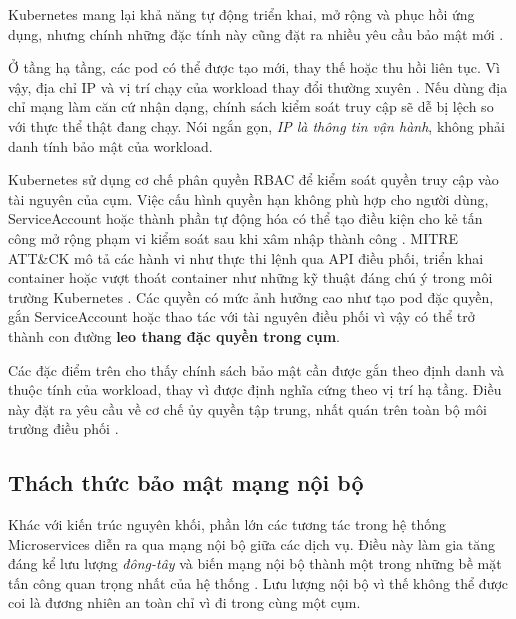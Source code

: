 Kubernetes mang lại khả năng tự động triển khai, mở rộng và phục hồi ứng dụng, nhưng chính những đặc tính này cũng đặt ra nhiều yêu cầu bảo mật mới \parencite{kubernetes_docs,rice2019kubernetes}.

Ở tầng hạ tầng, các pod có thể được tạo mới, thay thế hoặc thu hồi liên tục. Vì vậy, địa chỉ IP và vị trí chạy của workload thay đổi thường xuyên \parencite{k8s_pod_lifecycle}. Nếu dùng địa chỉ mạng làm căn cứ nhận dạng, chính sách kiểm soát truy cập sẽ dễ bị lệch so với thực thể thật đang chạy. Nói ngắn gọn, \textit{IP là thông tin vận hành}, không phải danh tính bảo mật của workload.

Kubernetes sử dụng cơ chế phân quyền RBAC để kiểm soát quyền truy cập vào tài nguyên của cụm. Việc cấu hình quyền hạn không phù hợp cho người dùng, ServiceAccount hoặc thành phần tự động hóa có thể tạo điều kiện cho kẻ tấn công mở rộng phạm vi kiểm soát sau khi xâm nhập thành công \parencite{kubernetes_docs}. MITRE ATT\&CK mô tả các hành vi như thực thi lệnh qua API điều phối, triển khai container hoặc vượt thoát container như những kỹ thuật đáng chú ý trong môi trường Kubernetes \parencite{mitre_t1609,mitre_t1610,mitre_t1611}. Các quyền có mức ảnh hưởng cao như tạo pod đặc quyền, gắn ServiceAccount hoặc thao tác với tài nguyên điều phối vì vậy có thể trở thành con đường \textbf{leo thang đặc quyền trong cụm}.

Các đặc điểm trên cho thấy chính sách bảo mật cần được gắn theo định danh và thuộc tính của workload, thay vì được định nghĩa cứng theo vị trí hạ tầng. Điều này đặt ra yêu cầu về cơ chế ủy quyền tập trung, nhất quán trên toàn bộ môi trường điều phối \parencite{nist800204b_abac_microservices,nist_abac}.

\subsection{Thách thức bảo mật mạng nội bộ}

Khác với kiến trúc nguyên khối, phần lớn các tương tác trong hệ thống Microservices diễn ra qua mạng nội bộ giữa các dịch vụ. Điều này làm gia tăng đáng kể lưu lượng \textit{đông-tây} và biến mạng nội bộ thành một trong những bề mặt tấn công quan trọng nhất của hệ thống \parencite{nist800204_microservices}. Lưu lượng nội bộ vì thế không thể được coi là đương nhiên an toàn chỉ vì đi trong cùng một cụm.

